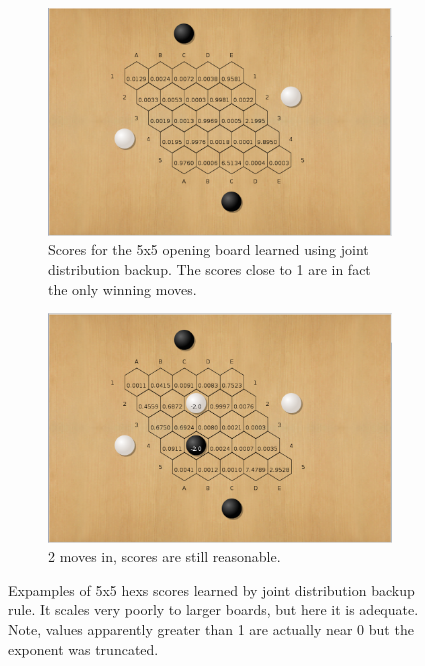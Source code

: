 \documentclass{article}
\begin{document}
\begin{figure}[!ht]
\centering
\begin{subfigure}[t]{.45\textwidth}
  \centering
      \includegraphics[width=1\textwidth]{pics/5x5_hex_opening.png}
  \caption{Scores for the 5x5 opening board learned using joint distribution backup. The scores close to 1 are in fact the only winning moves.}
  \label{fig:5x5_1}
\end{subfigure}\hfill
\begin{subfigure}[t]{.45\textwidth}
  \centering
      \includegraphics[width=1\textwidth]{pics/5x5_hex_2_moves.png}
  \caption{2 moves in, scores are still reasonable.}
  \label{fig:5x5_2}
\end{subfigure}
\caption{Expamples of 5x5 hexs scores learned by joint distribution backup rule. It scales very poorly to larger boards, but here it is adequate. Note, values  apparently greater than 1 are actually near 0 but the exponent was truncated.}
\label{fig:5x5}
\end{figure}
\end{document}
